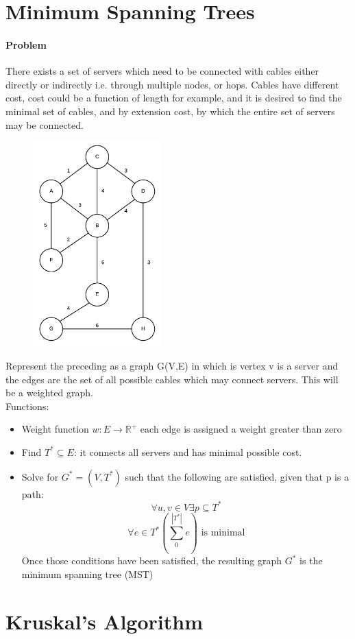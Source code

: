 \documentclass[12pt,letterpaper]{article}
\begin{document}
\section{Minimum Spanning Trees}
\paragraph{Problem}
There exists a set of servers which need to be connected with cables either directly or indirectly i.e. through multiple nodes, or hops. Cables have different cost, cost could be a function of length for example, and it is desired to find the minimal set of cables, and by extension cost, by which the entire set of servers may be connected. 
\begin{figure}[h]
\centering
\includegraphics[width=5cm]{mstprob}
\end{figure} 
Represent the preceding as a graph G(V,E) in which is vertex v is a server and the edges are the set of all possible cables which may connect servers. This will be a weighted graph. \\
Functions:
\begin{itemize}
\item Weight function $w : E\to \mathbb{R}^+$ each edge is assigned a weight greater than zero 
\item Find $T^*\subseteq E$: it connects all servers and has minimal possible cost.
\item Solve for $G^*=(V,T^*)$ such that the following are satisfied, given that p is a path:
\[\forall u,v\in V \exists p\subseteq T^*\] 
\[\forall e\in T^* \left( \sum_0^{|T^*|}{e} \right) \text{ is minimal}\]
Once those conditions have been satisfied, the resulting graph $G^*$ is the minimum spanning tree (MST)
\end{itemize}
\section{Kruskal's Algorithm}
\end{document}
